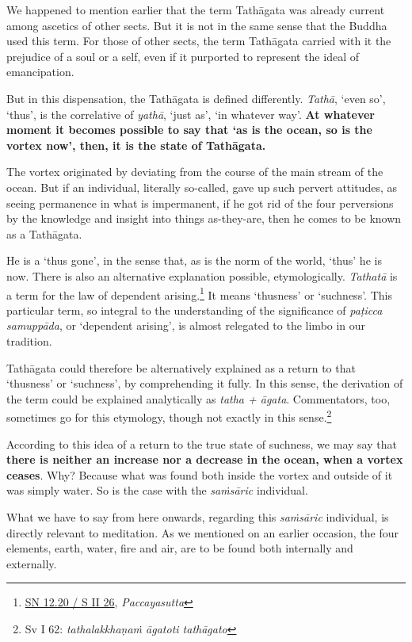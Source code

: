 We happened to mention earlier that the term Tathāgata was already current among ascetics of other sects. But it is not in the same sense that the Buddha used this term. For those of other sects, the term Tathāgata carried with it the prejudice of a soul or a self, even if it purported to represent the ideal of emancipation.

But in this dispensation, the Tathāgata is defined differently. \emph{Tathā}, `even so', `thus', is the correlative of \emph{yathā}, `just as', `in whatever way'. \textbf{At whatever moment it becomes possible to say that `as is the ocean, so is the vortex now', then, it is the state of Tathāgata.}

The vortex originated by deviating from the course of the main stream of the ocean. But if an individual, literally so-called, gave up such pervert attitudes, as seeing permanence in what is impermanent, if he got rid of the four perversions by the knowledge and insight into things as-they-are, then he comes to be known as a Tathāgata.

He is a `thus gone', in the sense that, as is the norm of the world, `thus' he is now. There is also an alternative explanation possible, etymologically. \emph{Tathatā} is a term for the law of dependent arising.\footnote{\href{https://suttacentral.net/sn12.20/pli/ms}{SN 12.20 / S II 26}, \emph{Paccayasutta}} It means `thusness' or `suchness'. This particular term, so integral to the understanding of the significance of \emph{paṭicca samuppāda}, or `dependent arising', is almost relegated to the limbo in our tradition.

Tathāgata could therefore be alternatively explained as a return to that `thusness' or `suchness', by comprehending it fully. In this sense, the derivation of the term could be explained analytically as \emph{tatha + āgata}. Commentators, too, sometimes go for this etymology, though not exactly in this sense.\footnote{Sv I 62: \emph{tathalakkhaṇaṁ āgatoti tathāgato}}

According to this idea of a return to the true state of suchness, we may say that \textbf{there is neither an increase nor a decrease in the ocean, when a vortex ceases}. Why? Because what was found both inside the vortex and outside of it was simply water. So is the case with the \emph{saṁsāric} individual.

What we have to say from here onwards, regarding this \emph{saṁsāric} individual, is directly relevant to meditation. As we mentioned on an earlier occasion, the four elements, earth, water, fire and air, are to be found both internally and externally.

